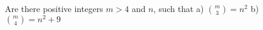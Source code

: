 Are there positive integers $m>4$ and $n$, such that
a)  ${m \choose 3}=n^2$
b) ${m \choose 4}=n^2+9$
